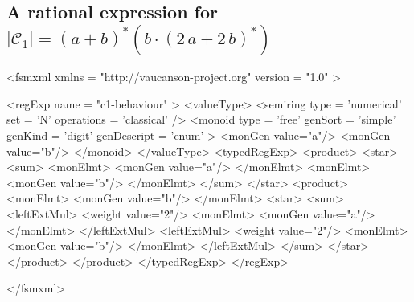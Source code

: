 \newpage

\subsection{A rational expression for
$|\mathcal{C}_{1}| = (a+b)^{*}(b\cdot(2\,a + 2\,b)^{*})$}
\label{regExpC1}

{\footnotesize
\begin{listing}[5]{1}
<fsmxml  xmlns   = "http://vaucanson-project.org"
         version = "1.0" >

<regExp name = "c1-behaviour" >
  <valueType>
    <semiring  type        = 'numerical'
               set         = 'N'
               operations  = 'classical' />
    <monoid    type        = 'free'
               genSort     = 'simple'
               genKind     = 'digit'
               genDescript = 'enum' >
      <monGen value="a"/>
      <monGen value="b"/>
    </monoid>
  </valueType>
  <typedRegExp>
    <product>
      <star>
        <sum>
          <monElmt>
            <monGen value="a"/>
          </monElmt>
          <monElmt>
            <monGen value="b"/>
          </monElmt>
        </sum>
      </star>
      <product>
        <monElmt>
          <monGen value="b"/>
        </monElmt>
        <star>
          <sum>
      <leftExtMul>
              <weight value="2"/>
        <monElmt>
    <monGen value="a"/>
        </monElmt>
      </leftExtMul>
      <leftExtMul>
              <weight value="2"/>
        <monElmt>
    <monGen value="b"/>
        </monElmt>
      </leftExtMul>
          </sum>
        </star>
      </product>
    </product>
  </typedRegExp>
</regExp>

</fsmxml>
\end{listing}
}

\clearpage
\newpage
